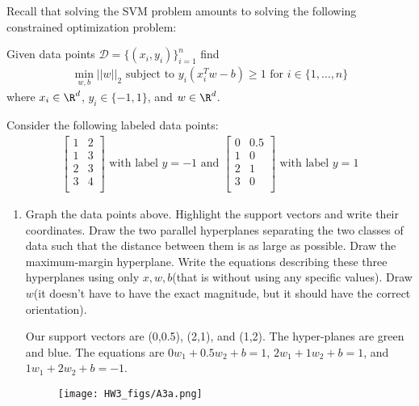 \documentclass{article}
\begin{document}
\begin{aprob}
    Recall that solving the SVM problem amounts to solving the following constrained optimization problem:
    \begin{center}
        Given data points $\mathcal{D} = \{(x_i, y_i)\}^n_{i=1}$ find
        \begin{align*}
            \min_{w, b} ||w||_2 \text{ subject to } y_i(x_i^Tw - b) \geq 1 \text{ for } i \in \{1, \dots, n\}
        \end{align*}
        where $x_i \in \R^d$, $y_i \in \{-1, 1\}$, and $w \in \R^d$.
    \end{center}
    Consider the following labeled data points:
    \begin{align*}
        \begin{bmatrix}
        1 & 2 \\
        1 & 3 \\
        2 & 3 \\
        3 & 4 \\
        \end{bmatrix} \text{ with label } y=-1 \text{ and } \begin{bmatrix}
        0 & 0.5 \\
        1 & 0 \\
        2 & 1 \\
        3 & 0 \\
        \end{bmatrix} \text{ with label } y=1
    \end{align*}
    \begin{enumerate}
        \item {} Graph the data points above. Highlight the support vectors and write their coordinates. Draw the two parallel hyperplanes separating the two classes of data such that the distance between them is as large as possible. Draw the maximum-margin hyperplane. Write the equations describing these three hyperplanes using only $x, w, b$(that is without using any specific values). Draw $w$(it doesn't have to have the exact magnitude, but it should have the correct orientation).
        
        Our support vectors are (0,0.5), (2,1), and (1,2). The hyper-planes are green and blue. The equations are $0 w_1 + 0.5 w_2 + b = 1$, $2 w_1 + 1 w_2 + b = 1$, and $1 w_1 + 2 w_2 + b = -1$.
        
        \begin{figure}[htp] 
        \centering
        \vspace*{-0.1in}
        \texttt{[image: HW3\_figs/A3a.png]}
        \label{figs:A3a.png}
        \end{figure}


\end{enumerate}
\end{aprob}
\end{document}
